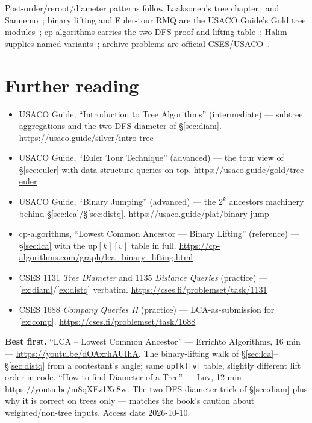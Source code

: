 \chapternotes
Post-order/reroot/diameter patterns follow Laaksonen's tree
chapter~\cite{laaksonen2024} and Sannemo~\cite{sannemo2025}; binary
lifting and Euler-tour RMQ are the USACO Guide's Gold tree
modules~\cite{usacoguide}; cp-algorithms carries the two-DFS proof
and lifting table~\cite{cpalgorithms}; Halim supplies named
variants~\cite{halimcp4}; archive problems are official
CSES/USACO~\cite{cses}.

\section*{Further reading}
\begin{itemize}
\item USACO Guide, ``Introduction to Tree Algorithms''
(intermediate) ---
subtree aggregations and the two-DFS diameter of \S\ref{sec:diam}. \newline\url{https://usaco.guide/silver/intro-tree}
\item USACO Guide, ``Euler Tour Technique'' (advanced) --- the tour view of
\S\ref{sec:euler} with data-structure queries on top. \newline\url{https://usaco.guide/gold/tree-euler}
\item USACO Guide, ``Binary Jumping'' (advanced) --- the $2^k$ ancestors
machinery behind \S\ref{sec:lca}/\S\ref{sec:distq}. \newline\url{https://usaco.guide/plat/binary-jump}
\item cp-algorithms, ``Lowest Common Ancestor --- Binary Lifting''
(reference) ---
\S\ref{sec:lca} with the $\mathrm{up}[k][v]$ table in full. \newline\url{https://cp-algorithms.com/graph/lca_binary_lifting.html}
\item CSES 1131 \emph{Tree Diameter} and 1135 \emph{Distance Queries}
(practice) ---
\ref{ex:diam}/\ref{ex:distq} verbatim. \newline\url{https://cses.fi/problemset/task/1131}
\item CSES 1688 \emph{Company Queries II} (practice) --- LCA-as-submission for
\ref{ex:comp}. \newline\url{https://cses.fi/problemset/task/1688}\end{itemize}

\begin{rulebox}
\smallskip\noindent\textbf{Best first.}
``LCA -- Lowest Common Ancestor'' --- Errichto Algorithms, 16 min ---
\url{https://youtu.be/dOAxrhAUIhA}. The binary-lifting
walk of \S\ref{sec:lca}--\S\ref{sec:distq} from a contestant's angle;
same \texttt{up[k][v]} table, slightly different lift order in code.
\smallskip\noindent
``How to find Diameter of a Tree'' --- Luv, 12 min ---
\url{https://youtu.be/m8qXEz1Xe8w}. The two-DFS
diameter trick of \S\ref{sec:diam} plus why it is correct on trees
only --- matches the book's caution about weighted/non-tree inputs.
Access date 2026-10-10.
\end{rulebox}
